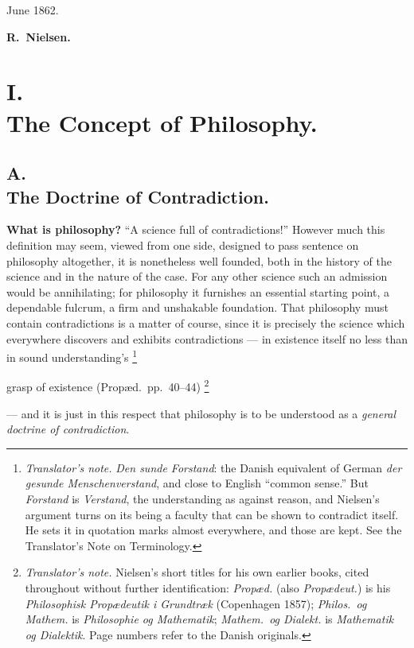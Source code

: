 \documentclass[12pt,a4paper]{book}
\renewcommand{\thefootnote}{\ifcase\value{footnote}\or *)\or **)\or ***)\fi}
\newcommand{\tnote}[1]{%
  \begingroup
  \renewcommand{\thefootnote}{\textdagger}%
  \footnote{\emph{Translator's note.} #1}%
  \addtocounter{footnote}{-1}%
  \endgroup}
\begin{document}
 June 1862.

\begin{flushright}
\textbf{R.~Nielsen.}
\end{flushright}


\chapter*{I.\\ The Concept of Philosophy.}

\section*{A.\\ The Doctrine of Contradiction.}

\textbf{What is philosophy?} ``A science full of contradictions!'' However much
this definition may seem, viewed from one side, designed to pass sentence on
philosophy altogether, it is nonetheless well founded, both in the history of
the science and in the nature of the case. For any other science such an
admission would be annihilating; for philosophy it furnishes an essential
starting point, a dependable fulcrum, a firm and unshakable foundation. That
philosophy must contain contradictions is a matter of course, since it is
precisely the science which everywhere discovers and exhibits contradictions
--- in existence itself no less than in sound understanding's\tnote{%
\emph{Den sunde Forstand}: the Danish equivalent of German \textit{der gesunde
Menschenverstand}, and close to English ``common sense.'' But \emph{Forstand}
is \textit{Verstand}, the understanding as against reason, and Nielsen's
argument turns on its being a faculty that can be shown to contradict itself.
He sets it in quotation marks almost everywhere, and those are kept. See the
Translator's Note on Terminology.} grasp of existence (Propæd.\ pp.~40--44)%
\tnote{Nielsen's short titles for his own earlier books, cited throughout
without further identification: \textit{Propæd.} (also \textit{Propædeut.}) is
his \textit{Philosophisk Propædeutik i Grundtræk} (Copenhagen 1857);
\textit{Philos.\ og Mathem.} is \textit{Philosophie og Mathematik};
\textit{Mathem.\ og Dialekt.} is \textit{Mathematik og Dialektik}. Page numbers
refer to the Danish originals.} --- and it is just in this respect that
philosophy is to be understood as a \emph{general doctrine of contradiction}.
\end{document}
